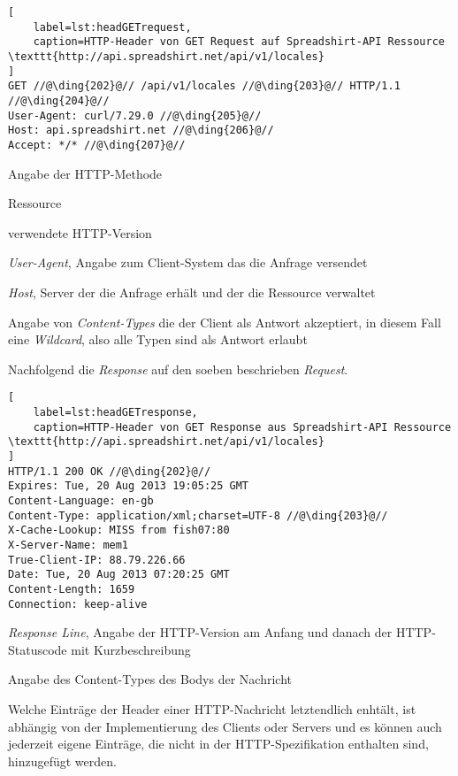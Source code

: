 \begin{lstlisting}[
    label=lst:headGETrequest,
    caption=HTTP-Header von GET Request auf Spreadshirt-API Ressource \texttt{http://api.spreadshirt.net/api/v1/locales}
]
GET //@\ding{202}@// /api/v1/locales //@\ding{203}@// HTTP/1.1 //@\ding{204}@//
User-Agent: curl/7.29.0 //@\ding{205}@//
Host: api.spreadshirt.net //@\ding{206}@//
Accept: */* //@\ding{207}@//
\end{lstlisting} 

\begin{compactitem}
    \item[\ding{202}] Angabe der HTTP-Methode
    \item[\ding{203}] Ressource
    \item[\ding{204}] verwendete HTTP-Version
    \item[\ding{205}] \emph{User-Agent}, Angabe zum Client-System das die Anfrage versendet
    \item[\ding{206}] \emph{Host}, Server der die Anfrage erhält und der die Ressource  verwaltet
    \item[\ding{207}] Angabe von \emph{Content-Types} die der Client als Antwort akzeptiert, in diesem Fall eine \emph{Wildcard}, also alle Typen sind als Antwort erlaubt
\end{compactitem}

Nachfolgend die \emph{Response} auf den soeben beschrieben \emph{Request}.

\begin{lstlisting}[
    label=lst:headGETresponse,
    caption=HTTP-Header von GET Response aus Spreadshirt-API Ressource \texttt{http://api.spreadshirt.net/api/v1/locales}
]
HTTP/1.1 200 OK //@\ding{202}@//
Expires: Tue, 20 Aug 2013 19:05:25 GMT
Content-Language: en-gb
Content-Type: application/xml;charset=UTF-8 //@\ding{203}@//
X-Cache-Lookup: MISS from fish07:80
X-Server-Name: mem1
True-Client-IP: 88.79.226.66
Date: Tue, 20 Aug 2013 07:20:25 GMT
Content-Length: 1659
Connection: keep-alive
\end{lstlisting}

\begin{compactitem}
    \item[\ding{202}] \emph{Response Line}, Angabe der HTTP-Version am Anfang und danach der HTTP-Statuscode mit Kurzbeschreibung
    \item[\ding{203}] Angabe des Content-Types des Bodys der Nachricht
\end{compactitem}

Welche Einträge der Header einer HTTP-Nachricht letztendlich enhtält, ist abhängig von der Implementierung des Clients oder Servers und es können auch jederzeit eigene Einträge, die nicht in der HTTP-Spezifikation enthalten sind, hinzugefügt werden.

